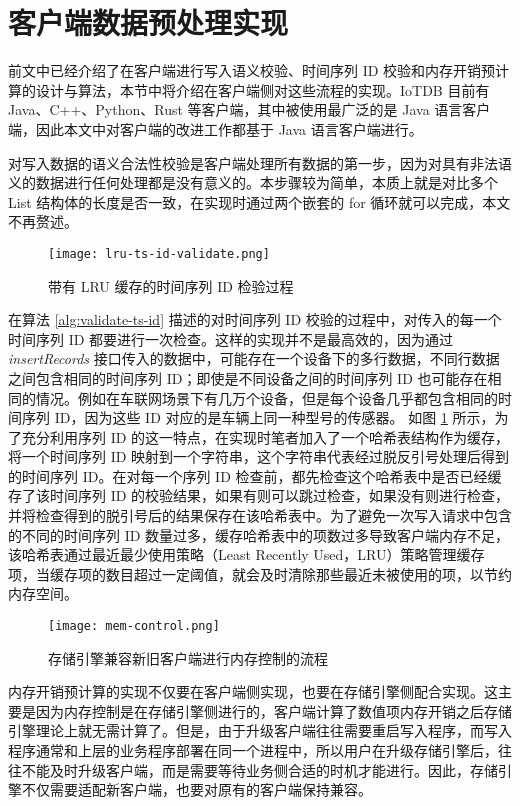 \section{客户端数据预处理实现}
前文中已经介绍了在客户端进行写入语义校验、时间序列 ID 校验和内存开销预计算的设计与算法，本节中将介绍在客户端侧对这些流程的实现。IoTDB 目前有 Java、C++、Python、Rust 等客户端，其中被使用最广泛的是 Java 语言客户端，因此本文中对客户端的改进工作都基于 Java 语言客户端进行。

对写入数据的语义合法性校验是客户端处理所有数据的第一步，因为对具有非法语义的数据进行任何处理都是没有意义的。本步骤较为简单，本质上就是对比多个 List 结构体的长度是否一致，在实现时通过两个嵌套的 for 循环就可以完成，本文不再赘述。

\begin{figure}
  \centering
  \texttt{[image: lru-ts-id-validate.png]}
  \caption{带有 LRU 缓存的时间序列 ID 检验过程}
  \label{fig:lru-ts-id-validate}
\end{figure}

在算法 \ref{alg:validate-ts-id} 描述的对时间序列 ID 校验的过程中，对传入的每一个时间序列 ID 都要进行一次检查。这样的实现并不是最高效的，因为通过 \emph{insertRecords} 接口传入的数据中，可能存在一个设备下的多行数据，不同行数据之间包含相同的时间序列 ID；即使是不同设备之间的时间序列 ID 也可能存在相同的情况。例如在车联网场景下有几万个设备，但是每个设备几乎都包含相同的时间序列 ID，因为这些 ID 对应的是车辆上同一种型号的传感器。 如图 \ref{fig:lru-ts-id-validate} 所示，为了充分利用序列 ID 的这一特点，在实现时笔者加入了一个哈希表结构作为缓存，将一个时间序列 ID 映射到一个字符串，这个字符串代表经过脱反引号处理后得到的时间序列 ID。在对每一个序列 ID 检查前，都先检查这个哈希表中是否已经缓存了该时间序列 ID 的校验结果，如果有则可以跳过检查，如果没有则进行检查，并将检查得到的脱引号后的结果保存在该哈希表中。为了避免一次写入请求中包含的不同的时间序列 ID 数量过多，缓存哈希表中的项数过多导致客户端内存不足，该哈希表通过最近最少使用策略（Least Recently Used，LRU）策略管理缓存项，当缓存项的数目超过一定阈值，就会及时清除那些最近未被使用的项，以节约内存空间。

\begin{figure}
  \centering
  \texttt{[image: mem-control.png]}
  \caption{存储引擎兼容新旧客户端进行内存控制的流程}
  \label{fig:mem-control-compatibility}
\end{figure}


内存开销预计算的实现不仅要在客户端侧实现，也要在存储引擎侧配合实现。这主要是因为内存控制是在存储引擎侧进行的，客户端计算了数值项内存开销之后存储引擎理论上就无需计算了。但是，由于升级客户端往往需要重启写入程序，而写入程序通常和上层的业务程序部署在同一个进程中，所以用户在升级存储引擎后，往往不能及时升级客户端，而是需要等待业务侧合适的时机才能进行。因此，存储引擎不仅需要适配新客户端，也要对原有的客户端保持兼容。


